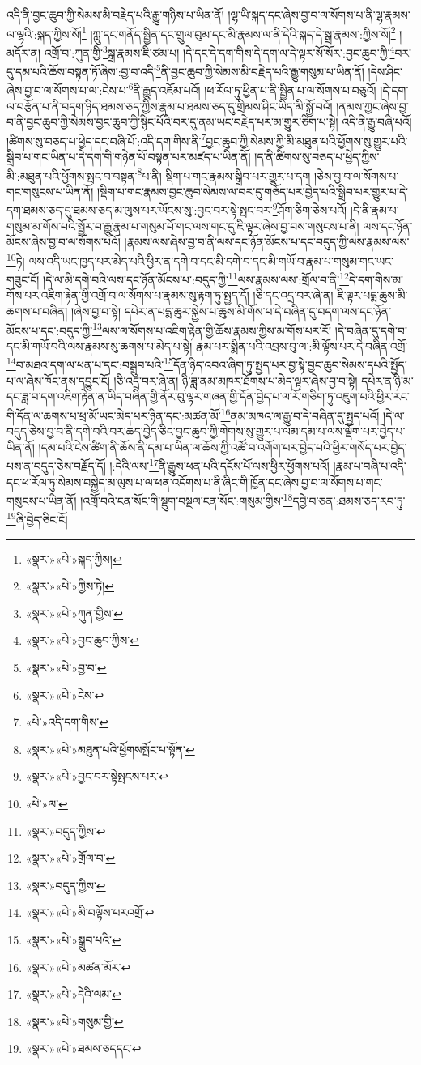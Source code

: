 འདི་ནི་བྱང་ཆུབ་ཀྱི་སེམས་མི་བརྗེད་པའི་རྒྱུ་གཉིས་པ་ཡིན་ནོ། །ལྷ་ཡི་སྐད་དང་ཞེས་བྱ་བ་ལ་སོགས་པ་ནི་ལྷ་རྣམས་ལ་ལྷའི་:སྐད་ཀྱིས་སོ།\footnote{«སྣར་»«པེ་»སྐད་ཀྱིས།} །ཀླུ་དང་གནོད་སྦྱིན་དང་གྲུལ་བུམ་དང་མི་རྣམས་ལ་ནི་དེའི་སྐད་དེ་སྒྲ་རྣམས་:ཀྱིས་སོ།\footnote{«སྣར་»«པེ་»ཀྱིས་ཏེ།} །མདོར་ན། འགྲོ་བ་:ཀུན་གྱི་\footnote{«སྣར་»«པེ་»ཀུན་གྱིས་}སྒྲ་རྣམས་ཇི་ཙམ་པ། །དེ་དང་དེ་དག་གིས་དེ་དག་ལ་དེ་ལྟར་སོ་སོར་:བྱང་ཆུབ་ཀྱི་\footnote{«སྣར་»«པེ་»བྱང་ཆུབ་ཀྱིས་}བར་དུ་དམ་པའི་ཆོས་བསྟན་ཏོ་ཞེས་:བྱ་བ་འདི་\footnote{«སྣར་»«པེ་»བྱ་བ་}ནི་བྱང་ཆུབ་ཀྱི་སེམས་མི་བརྗེད་པའི་རྒྱུ་གསུམ་པ་ཡིན་ནོ། །དེས་ཤིང་ཞེས་བྱ་བ་ལ་སོགས་པ་ལ་:ངེས་པ་\footnote{«སྣར་»«པེ་»ངེས་}ནི་རྒྱུད་འཇོམ་པའོ། །ཕ་རོལ་ཏུ་ཕྱིན་པ་ནི་སྦྱིན་པ་ལ་སོགས་པ་བཅུའོ། །དེ་དག་ལ་བརྩོན་པ་ནི་བདག་ཉིད་ཐམས་ཅད་ཀྱིས་རྣམ་པ་ཐམས་ཅད་དུ་གྲིམས་ཤིང་ཡིད་མི་སྐྱོ་བའོ། །ནམས་ཀྱང་ཞེས་བྱ་བ་ནི་བྱང་ཆུབ་ཀྱི་སེམས་བྱང་ཆུབ་ཀྱི་སྙིང་པོའི་བར་དུ་ནམ་ཡང་བརྗེད་པར་མ་གྱུར་ཅིག་པ་སྟེ། འདི་ནི་རྒྱུ་བཞི་པའོ། །ཚིགས་སུ་བཅད་པ་ཕྱེད་དང་བཞི་པོ་:འདི་དག་གིས་ནི་\footnote{«པེ་»འདི་དག་གིས་}བྱང་ཆུབ་ཀྱི་སེམས་ཀྱི་མི་མཐུན་པའི་ཕྱོགས་སུ་གྱུར་པའི་སྒྲིབ་པ་གང་ཡིན་པ་དེ་དག་གི་གཉེན་པོ་བསྟན་པར་མཛད་པ་ཡིན་ནོ། །ད་ནི་ཚིགས་སུ་བཅད་པ་ཕྱེད་ཀྱིས་མི་:མཐུན་པའི་ཕྱོགས་སྤང་བ་བསྟན་\footnote{«སྣར་»«པེ་»མཐུན་པའི་ཕྱོགསསྤོང་པ་སྟོན་}པ་ནི། སྡིག་པ་གང་རྣམས་སྒྲིབ་པར་གྱུར་པ་དག །ཅེས་བྱ་བ་ལ་སོགས་པ་གང་གསུངས་པ་ཡིན་ནོ། །སྡིག་པ་གང་རྣམས་བྱང་ཆུབ་སེམས་ལ་བར་དུ་གཅོད་པར་བྱེད་པའི་སྒྲིབ་པར་གྱུར་པ་དེ་དག་ཐམས་ཅད་དུ་ཐམས་ཅད་མ་ལུས་པར་ཡོངས་སུ་:བྱང་བར་སྟེ་སྤང་བར་\footnote{«སྣར་»«པེ་»བྱང་བར་སྟེསྤངས་པར་}ཤོག་ཅིག་ཅེས་པའོ། །དེ་ནི་རྣམ་པ་གསུམ་མ་གོས་པའི་སྦྱོར་བ་རྒྱུ་རྣམ་པ་གསུམ་པོ་གང་ལས་གང་དུ་ཇི་ལྟར་ཞེས་བྱ་བས་གསུངས་པ་ནི། ལས་དང་ཉོན་མོངས་ཞེས་བྱ་བ་ལ་སོགས་པའོ། །རྣམས་ལས་ཞེས་བྱ་བ་ནི་ལས་དང་ཉོན་མོངས་པ་དང་བདུད་ཀྱི་ལས་རྣམས་ལས་\footnote{«པེ་»ལ་}ཏེ། ལས་འདི་ཡང་ཁྱད་པར་མེད་པའི་ཕྱིར་ན་དགེ་བ་དང་མི་དགེ་བ་དང་མི་གཡོ་བ་རྣམ་པ་གསུམ་གང་ཡང་གཟུང་ངོ། །དེ་ལ་མི་དགེ་བའི་ལས་དང་ཉོན་མོངས་པ་:བདུད་ཀྱི་\footnote{«སྣར་»བདུད་ཀྱིས་}ལས་རྣམས་ལས་:གྲོལ་བ་ནི་\footnote{«སྣར་»«པེ་»གྲོལ་བ་}དེ་དག་གིས་མ་གོས་པར་འཇིག་རྟེན་གྱི་འགྲོ་བ་ལ་སོགས་པ་རྣམས་སུ་རྟག་ཏུ་སྤྱད་དོ། །ཅི་དང་འདྲ་བར་ཞེ་ན། ཇི་ལྟར་པདྨ་ཆུས་མི་ཆགས་པ་བཞིན། །ཞེས་བྱ་བ་སྟེ། དཔེར་ན་པདྨ་ཆུར་སྐྱེས་པ་ཆུས་མི་གོས་པ་དེ་བཞིན་དུ་བདག་ལས་དང་ཉོན་མོངས་པ་དང་:བདུད་ཀྱི་\footnote{«སྣར་»བདུད་ཀྱིས་}ལས་ལ་སོགས་པ་འཇིག་རྟེན་གྱི་ཆོས་རྣམས་ཀྱིས་མ་གོས་པར་རོ། །དེ་བཞིན་དུ་དགེ་བ་དང་མི་གཡོ་བའི་ལས་རྣམས་སུ་ཆགས་པ་མེད་པ་སྟེ། རྣམ་པར་སྨིན་པའི་འབྲས་བུ་ལ་:མི་ལྟོས་པར་དེ་བཞིན་འགྲོ་\footnote{«སྣར་»«པེ་»མི་བལྟོས་པརའགྲོ་}བ་མཐའ་དག་ལ་ཕན་པ་དང་:བསྒྲུབ་པའི་\footnote{«སྣར་»«པེ་»སྒྲུབ་པའི་}དོན་ཉིད་འབའ་ཞིག་ཏུ་སྤྱད་པར་བྱ་སྟེ་བྱང་ཆུབ་སེམས་དཔའི་སྤྱོད་པ་ལ་ཞེས་ཁོང་ནས་དབྱུང་ངོ། །ཅི་འདྲ་བར་ཞེ་ན། ཉི་ཟླ་ནམ་མཁར་ཐོགས་པ་མེད་ལྟར་ཞེས་བྱ་བ་སྟེ། དཔེར་ན་ཉི་མ་དང་ཟླ་བ་དག་འཇིག་རྟེན་ན་ཡིད་བཞིན་གྱི་ནོར་བུ་ལྟར་གཞན་གྱི་དོན་བྱེད་པ་ལ་རོ་གཅིག་ཏུ་འཇུག་པའི་ཕྱིར་རང་གི་དོན་ལ་ཆགས་པ་ཕྲ་མོ་ཡང་མེད་པར་ཉིན་དང་:མཚན་མོ་\footnote{«སྣར་»«པེ་»མཚན་མོར་}ནམ་མཁའ་ལ་རྒྱུ་བ་དེ་བཞིན་དུ་སྤྱད་པའོ། །དེ་ལ་བདུད་ཅེས་བྱ་བ་ནི་དགེ་བའི་བར་ཆད་བྱེད་ཅིང་བྱང་ཆུབ་ཀྱི་གེགས་སུ་གྱུར་པ་ལམ་དམ་པ་ལས་ལྡོག་པར་བྱེད་པ་ཡིན་ནོ། །དམ་པའི་ངེས་ཚིག་ནི་ཆོས་ནི་དམ་པ་ཡིན་ལ་ཆོས་ཀྱི་འཚོ་བ་འགོག་པར་བྱེད་པའི་ཕྱིར་གསོད་པར་བྱེད་པས་ན་བདུད་ཅེས་བརྗོད་དོ། །:དེའི་ལས་\footnote{«སྣར་»«པེ་»དེའི་ལམ་}ནི་རྒྱུས་ཕན་པའི་དངོས་པོ་ལས་ཕྱིར་ཕྱོགས་པའོ། །རྣམ་པ་བཞི་པ་འདི་དང་ཕ་རོལ་ཏུ་སེམས་བསྐྱེད་མ་ལུས་པ་ལ་ཕན་འདོགས་པ་ནི་ཞིང་གི་ཁྱོན་དང་ཞེས་བྱ་བ་ལ་སོགས་པ་གང་གསུངས་པ་ཡིན་ནོ། །འགྲོ་བའི་ངན་སོང་གི་སྡུག་བསྔལ་ངན་སོང་:གསུམ་གྱིས་\footnote{«སྣར་»«པེ་»གསུམ་གྱི་}དབྱེ་བ་ཅན་:ཐམས་ཅད་རབ་ཏུ་\footnote{«སྣར་»«པེ་»ཐམས་ཅདདང་}ཞི་བྱེད་ཅིང་ངོ། 
